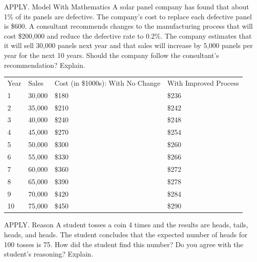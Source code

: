 \documentclass{article}
\newenvironment{practice}[2]{}{}        %
\newcommand{\answer}[1]{}               %
\newcommand{\te}[1]{}                   %
\begin{document}
\begin{practice}{21}{3}
APPLY. Model With Mathematics A solar panel company has found that about 1\% of its panels are defective. The company's cost to replace each defective panel is \$600. A consultant recommends changes to the manufacturing process that will cost \$200,000 and reduce the defective rate to 0.2\%. The company estimates that it will sell 30,000 panels next year and that sales will increase by 5,000 panels per year for the next 10 years. Should the company follow the consultant's recommendation? Explain.
\answer{In the next year, if the company makes no changes, about (0.01\cdot30,000=300) panels will be defective, incurring a cost of (300\cdot\$600=\$180,000). If they make the changes, the expected total cost is (\$200,000+0.002\cdot30,000\cdot\$600=\$236,000). For the next year, it makes sense not to improve the process. But the company also predicts that sales will increase by 5,000 per year. Yearly costs of defective panels:}
\begin{tabular}{llll}
Year & Sales & Cost (in \$1000s): With No Change & With Improved Process \\
1 & 30,000 & \$180 & \$236 \\
2 & 35,000 & \$210 & \$242 \\
3 & 40,000 & \$240 & \$248 \\
4 & 45,000 & \$270 & \$254 \\
5 & 50,000 & \$300 & \$260 \\
6 & 55,000 & \$330 & \$266 \\
7 & 60,000 & \$360 & \$272 \\
8 & 65,000 & \$390 & \$278 \\
9 & 70,000 & \$420 & \$284 \\
10 & 75,000 & \$450 & \$290 \\
\end{tabular}
\answer{For 3 years it is less costly to make no change. After 3 years, improving the process becomes a better option.}
\te{Printed yearly improved costs include \$200,000 every year; likely the stated process-change cost is a one-time cost, which would change the comparison. Table and conclusion preserved.}
\end{practice}
\begin{practice}{22}{3}
APPLY. Reason A student tosses a coin 4 times and the results are heads, tails, heads, and heads. The student concludes that the expected number of heads for 100 tosses is 75. How did the student find this number? Do you agree with the student's reasoning? Explain.
\answer{Since 3 of the 4 tosses were Heads, the student concludes that (P(heads)) is 3 out of 4, or 75\%. This is not good reasoning because the sample size is so small. Since a fair coin would have a probability of 50\% for Heads, the student should draw a much larger sample before concluding that the probability is not 50\%.}
\end{practice}
\end{document}
